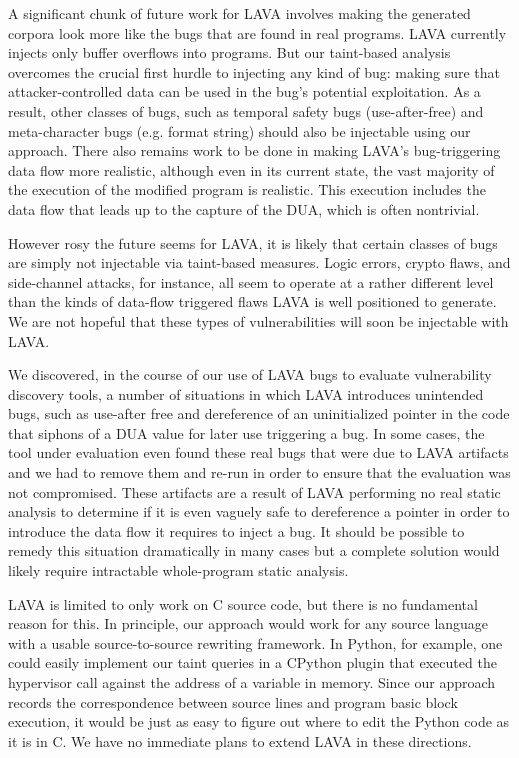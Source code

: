 
A significant chunk of future work for LAVA involves making the generated corpora look more like the bugs that are found in real programs. 
LAVA currently injects only buffer overflows into programs.
But our taint-based analysis overcomes the crucial first hurdle to injecting any kind of bug: making sure that attacker-controlled data can be used in the bug's potential exploitation. 
As a result, other classes of bugs, such as temporal safety bugs (use-after-free) and meta-character bugs (e.g. format string) should also be injectable using our approach. 
There also remains work to be done in making LAVA's bug-triggering data flow more realistic, although even in its current state, the vast majority of the execution of the modified program is realistic. 
This execution includes the data flow that leads up to the capture of the DUA, which is often nontrivial.

However rosy the future seems for LAVA, it is likely that certain classes of bugs are simply not injectable via taint-based measures.
Logic errors, crypto flaws, and side-channel attacks, for instance, all seem to operate at a rather different level than the kinds of data-flow triggered flaws LAVA is well positioned to generate.
We are not hopeful that these types of vulnerabilities will soon be injectable with LAVA. 

We discovered, in the course of our use of LAVA bugs to evaluate vulnerability discovery tools, a number of situations in which LAVA introduces unintended bugs, such as use-after free and dereference of an uninitialized pointer in the code that siphons of a DUA value for later use triggering a bug.  
In some cases, the tool under evaluation even found these real bugs that were due to LAVA artifacts and we had to remove them and re-run in order to ensure that the evaluation was not compromised. 
These artifacts are a result of LAVA performing no real static analysis to determine if it is even vaguely safe to dereference a pointer in order to introduce the data flow it requires to inject a bug.
It should be possible to remedy this situation dramatically in many cases but a complete solution would likely require intractable whole-program static analysis.  

LAVA is limited to only work on C source code, but there is no fundamental reason for this.
In principle, our approach would work for any source language with a usable source-to-source rewriting framework. 
In Python, for example, one could easily implement our taint queries in a CPython plugin that executed the hypervisor call against the address of a variable in memory. 
Since our approach records the correspondence between source lines and program basic block execution, it would be just as easy to figure out where to edit the Python code as it is in C.
We have no immediate plans to extend LAVA in these directions.

